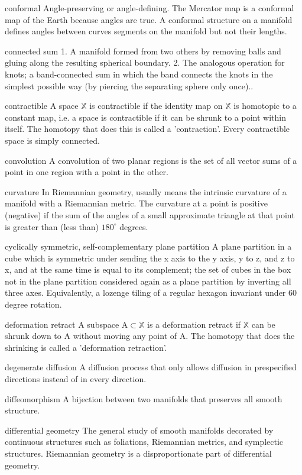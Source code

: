 \begin{description}
\begin{tiny}
\item[conformal] Angle-preserving or angle-defining. The Mercator map is a conformal map of the Earth because angles are true. A conformal structure on a manifold defines angles between curves segments on the manifold but not their lengths.
\item[connected sum] 1. A manifold formed from two others by removing balls and gluing along the resulting spherical boundary.
2. The analogous operation for knots; a band-connected sum in which the band connects the knots in the simplest possible way (by piercing the separating sphere only once)..
\item[contractible] A space $\mathbb{X}$ is contractible if the identity map on $\mathbb{X}$ is homotopic to a constant map, i.e. a space is contractible if it can be shrunk to a point within itself. The homotopy that does this is called a 'contraction'. Every contractible space is simply connected.
\item[convolution] A convolution of two planar regions is the set of all vector sums of a point in one region with a point in the other.
\item[curvature] In Riemannian geometry, usually means the intrinsic curvature of a manifold with a Riemannian metric.  The curvature at a point is positive (negative) if the sum of the angles of a small approximate triangle at that point is greater than (less than) $180^{\circ}$ degrees.
\item[cyclically symmetric, self-complementary plane partition] A plane partition in a cube which is symmetric under sending the x axis to the y axis, y to z, and z to x, and at the same time is equal to its complement; the set of cubes in the box not in the plane partition considered again as a plane partition by inverting all three axes. Equivalently, a lozenge tiling of a regular hexagon invariant under 60 degree rotation.
\item[deformation retract] A subspace $\mathrm{A} \subset \mathbb{X}$ is a deformation retract if $\mathbb{X}$ can be shrunk
down to $\mathrm{A}$ without moving any point of $\mathrm{A}$. The homotopy that does the shrinking is called a 'deformation retraction'.
\item[degenerate diffusion] A diffusion process that only allows diffusion in prespecified directions instead of in every direction.
\item[diffeomorphism] A bijection between two manifolds that preserves all smooth structure.
\item[differential geometry] The general study of smooth manifolds decorated by continuous structures such as foliations, Riemannian metrics, and symplectic structures. Riemannian geometry is a disproportionate part of differential geometry.

\end{tiny}
\end{description}
